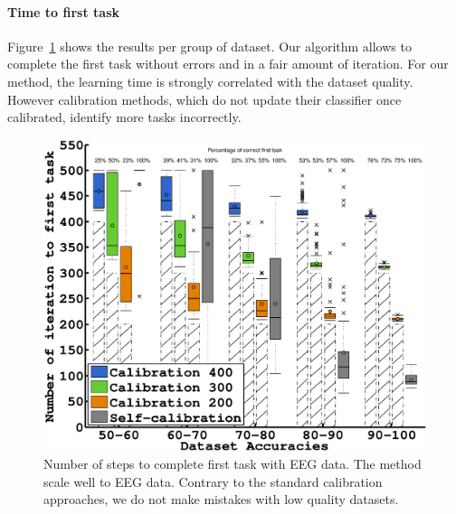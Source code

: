 \paragraph{Time to first task}

Figure~\ref{fig:firstEEG} shows the results per group of dataset. Our algorithm allows to complete the first task without errors and in a fair amount of iteration.  For our method, the learning time is strongly correlated with the dataset quality. However calibration methods, which do not update their classifier once calibrated, identify more tasks incorrectly.

\begin{figure}[!ht]
\centering
\includegraphics[width=\columnwidth]{img/plots_aaai/plot_EEG_calib_firstconf.eps}
\caption{Number of steps to complete first task with EEG data. The method scale well to EEG data. Contrary to the standard calibration approaches, we do not make mistakes with low quality datasets.}
\label{fig:firstEEG}
\end{figure} 


